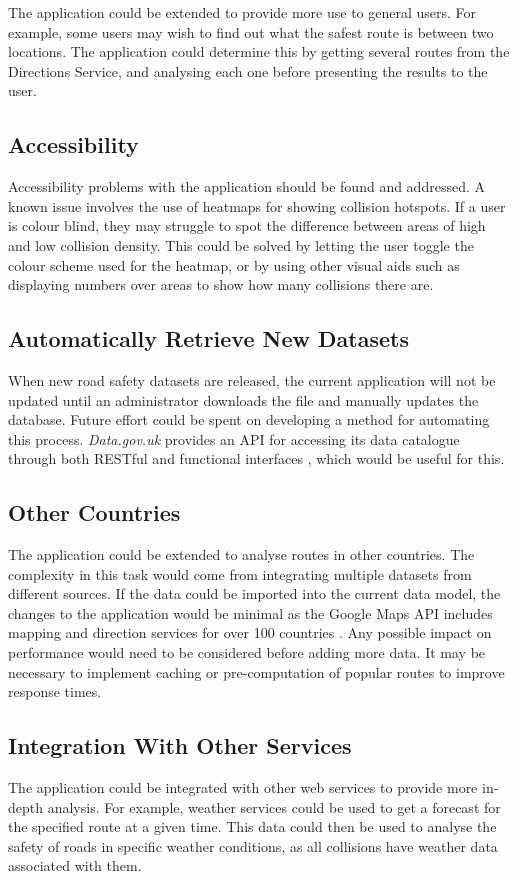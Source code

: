 \documentclass[authoryearcitations]{UoYCSproject}
\begin{document}
The application could be extended to provide more use to general users. For example, some users may wish to find out what the safest route is between two locations. The application could determine this by getting several routes from the Directions Service, and analysing each one before presenting the results to the user.

\subsection{Accessibility}

Accessibility problems with the application should be found and addressed. A known issue involves the use of heatmaps for showing collision hotspots. If a user is colour blind, they may struggle to spot the difference between areas of high and low collision density. This could be solved by letting the user toggle the colour scheme used for the heatmap, or by using other visual aids such as displaying numbers over areas to show how many collisions there are.

\subsection{Automatically Retrieve New Datasets}

When new road safety datasets are released, the current application will not be updated until an administrator downloads the file and manually updates the database. Future effort could be spent on developing a method for automating this process. \textit{Data.gov.uk} provides an API for accessing its data catalogue through both RESTful and functional interfaces \citep{Data.gov.uk}, which would be useful for this. 

\subsection{Other Countries}

The application could be extended to analyse routes in other countries. The complexity in this task would come from integrating multiple datasets from different sources. If the data could be imported into the current data model, the changes to the application would be minimal as the Google Maps API includes mapping and direction services for over 100 countries \citep{Googlea}. Any possible impact on performance would need to be considered before adding more data. It may be necessary to implement caching or pre-computation of popular routes to improve response times.

\subsection{Integration With Other Services}

The application could be integrated with other web services to provide more in-depth analysis. For example, weather services could be used to get a forecast for the specified route at a given time. This data could then be used to analyse the safety of roads in specific weather conditions, as all collisions have weather data associated with them.


\end{document}
